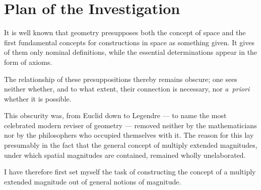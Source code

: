 \documentclass{article}
\begin{document}
\section*{Plan of the Investigation}

It is well known that geometry presupposes both the concept of space and the first
fundamental concepts for constructions in space as something given. It gives of them
only nominal definitions, while the essential determinations appear in the form of
axioms.

The relationship of these presuppositions thereby remains obscure; one sees neither
whether, and to what extent, their connection is necessary, nor \emph{a~priori}
whether it is possible.

This obscurity was, from Euclid down to Legendre --- to name the most celebrated modern
reviser of geometry --- removed neither by the mathematicians nor by the philosophers
who occupied themselves with it. The reason for this lay presumably in the fact that
the general concept of multiply extended magnitudes, under which spatial magnitudes are
contained, remained wholly unelaborated.

I have therefore first set myself the task of constructing the concept of a multiply
extended magnitude out of general notions of magnitude.
\end{document}
